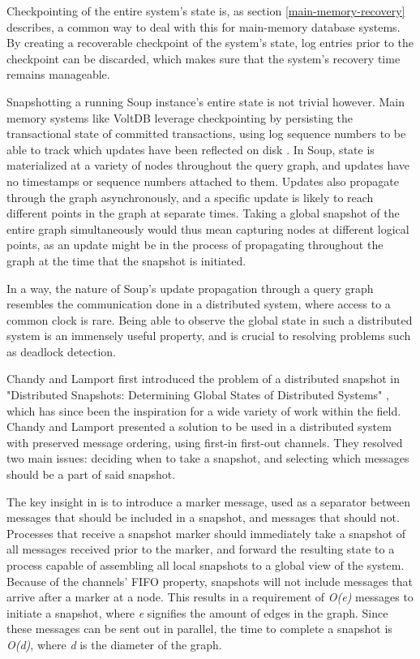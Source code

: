 \documentclass[b5paper]{report}
\begin{document}
Checkpointing of the entire system's state is, as section
\ref{main-memory-recovery} describes, a common way to deal with this for
main-memory database systems. By creating a recoverable checkpoint of the
system's state, log entries prior to the checkpoint can be discarded, which
makes sure that the system's recovery time remains manageable.

Snapshotting a running Soup instance's entire state is not trivial however.
Main memory systems like VoltDB leverage checkpointing by persisting the
transactional state of committed transactions, using log sequence numbers to be
able to track which updates have been reflected on disk \cite{voltdb-recovery}.
In Soup, state is materialized at a variety of nodes throughout the query graph,
and updates have no timestamps or sequence numbers attached to them. Updates
also propagate through the graph asynchronously, and a specific update is likely
to reach different points in the graph at separate times. Taking a global
snapshot of the entire graph simultaneously would thus mean capturing nodes at
different logical points, as an update might be in the process of propagating
throughout the graph at the time that the snapshot is initiated.

In a way, the nature of Soup's update propagation through a query graph
resembles the communication done in a distributed system, where access to a
common clock is rare. Being able to observe the global state in such a
distributed system is an immensely useful property, and is crucial to resolving
problems such as deadlock detection.

Chandy and Lamport first introduced the problem of a distributed snapshot in
"Distributed Snapshots: Determining Global States of Distributed Systems"
\cite{chandy-lamport}, which has since been the inspiration for a wide variety
of work within the field. Chandy and Lamport presented a solution to be used in
a distributed system with preserved message ordering, using first-in first-out
channels. They resolved two main issues: deciding when to take a snapshot, and
selecting which messages should be a part of said snapshot.

The key insight in \cite{chandy-lamport} is to introduce a marker message, used
as a separator between messages that should be included in a snapshot, and
messages that should not. Processes that receive a snapshot marker should
immediately take a snapshot of all messages received prior to the marker, and
forward the resulting state to a process capable of assembling all local
snapshots to a global view of the system. Because of the channels' FIFO
property, snapshots will not include messages that arrive after a marker at a
node. This results in a requirement of \textit{O(e)} messages to initiate a
snapshot, where \textit{e} signifies the amount of edges in the graph. Since
these messages can be sent out in parallel, the time to complete a snapshot is
\textit{O(d)}, where \textit{d} is the diameter of the graph.
\end{document}
